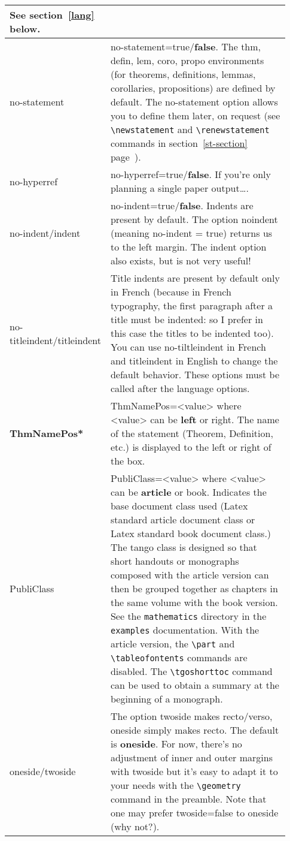 \documentclass[english,ColorTheme=Red,FontSize=10pt]{tango}
\newcommand\DO[1]{\textcolor{ColorOne}{\bfseries #1}}
\newcommand\TO[1]{\textsf{#1}}
\begin{document}
\begin{longtable}{p{0.23\linewidth}p{0.7\linewidth}}
See section~\ref{lang} below.\\
\hline
\TO{no-statement}&\TO{no-statement=true/\DO{false}}. The  \TO{thm}, \TO{defin}, \TO{lem}, \TO{coro}, \TO{propo} environments (for theorems, definitions, lemmas, corollaries, propositions) are defined by default. The no-statement option allows you to define them later, on request (see \verb=\newstatement= and \verb=\renewstatement= commands in section~\ref{st-section} page~\pageref{st-section}).\\
\hline
\TO{no-hyperref}&\TO{no-hyperref=true/\DO{false}}. If you're only planning a single paper output….\\
\hline
\TO{no-indent/indent}&\TO{no-indent=true/\DO{false}}. Indents are present by default. The option \TO{noindent} (meaning \TO{no-indent = true}) returns us to the left margin. The \TO{indent} option also exists, but is not very useful!\\
\hline
\TO{no-titleindent}/\TO{titleindent}&Title indents are present by default only in French (because in French typography, the first paragraph after a title must be indented: so I prefer in this case the titles to be indented too). You can use no-tiltleindent in French and titleindent in English to change the default behavior. These options must be called after the language options.\\
\hline
\TO{\textbf{ThmNamePos*}}&\TO{ThmNamePos=<value>} where \TO{<value>} can be \TO{\DO{left}} or \TO{right}. The name of the statement (Theorem, Definition, etc.) is displayed to the left or right of the box.\\
\hline
\TO{PubliClass}&\TO{PubliClass=<value>} where \TO{<value>} can be \TO{\DO{article}} or \TO{book}. Indicates the base document class used (Latex standard \TO{article} document class or Latex standard \TO{book} document class.) The tango class is designed so that short handouts or monographs composed with the \TO{article} version can then be grouped together as chapters in the same volume with the \TO{book} version. See the \texttt{mathematics} directory in the \texttt{examples} documentation. With the \TO{article} version, the \verb=\part= and \verb=\tableofontents= commands are disabled. The \verb=\tgoshorttoc= command can be used to obtain a summary at the beginning of a monograph.\\
\hline
\TO{oneside/twoside}& The option \TO{twoside} makes recto/verso, \TO{oneside} simply makes recto. The default is \TO{\DO{oneside}}. For now, there's no adjustment of inner and outer margins with twoside but it's easy to adapt it to your needs with the \verb=\geometry= command in the preamble. Note that one may prefer \TO{twoside=false} to \TO{oneside} (why not?).\\

\end{longtable}
\end{document}
